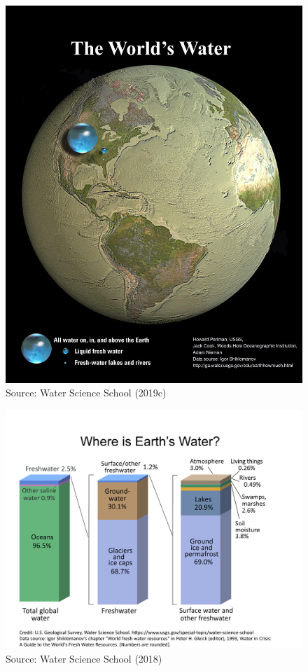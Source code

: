 \documentclass[
  letterpaper,
  DIV=11,
  numbers=noendperiod]{scrreprt}
\begin{document}
\begin{figure}

{\centering \includegraphics{archive/figures/all-the-worlds-water.jpg}

}

\caption{Source: Water Science School (2019c)}

\end{figure}

\begin{figure}

{\centering \includegraphics{archive/figures/EarthsWater-BarChart.png}

}

\caption{Source: Water Science School (2018)}

\end{figure}
\end{document}
